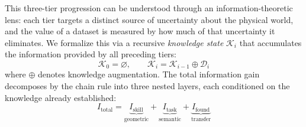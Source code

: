 \documentclass[acmsmall,screen,review,anonymous]{acmart}
\begin{document}
This three-tier progression can be understood through an information-theoretic lens: each tier targets a distinct source of uncertainty about the physical world, and the value of a dataset is measured by how much of that uncertainty it eliminates. We formalize this via a recursive \emph{knowledge state} $\mathcal{K}_i$ that accumulates the information provided by all preceding tiers:
\begin{equation}\label{eq:knowledge_state}
\mathcal{K}_0 = \varnothing, \qquad \mathcal{K}_i = \mathcal{K}_{i-1} \oplus \mathcal{D}_i
\end{equation}
where $\oplus$ denotes knowledge augmentation. The total information gain decomposes by the chain rule into three nested layers, each conditioned on the knowledge already established:
\begin{equation}\label{eq:chain_rule}
I_{\text{total}} = \underbrace{I_{\text{skill}}}_{\text{geometric}} + \underbrace{I_{\text{task}}}_{\text{semantic}} + \underbrace{I_{\text{found}}}_{\text{transfer}}
\end{equation}
\end{document}
